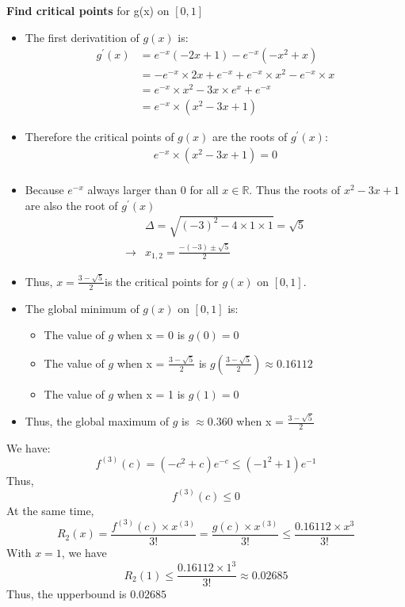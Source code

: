 \documentclass{article}
\begin{document}
\begin{enumerate}[label=({\alph*})]
        \textbf{Find critical points} for g(x) on \([0, 1]\)
        \begin{itemize}
            \item The first derivatition of \(g(x)\) is:
            \begin{align*}
                g^{'}(x) &= e^{-x}(-2x + 1) - e^{-x}(-x^{2} + x) \\
                &= -e^{-x} \times 2x + e^{-x} + e^{-x} \times x^{2} - e^{-x} \times x \\
                &= e^{-x} \times x^{2} - 3x \times e^{x} + e^{-x} \\
                &= e^{-x} \times (x^{2} - 3x + 1) 
            \end{align*}
            \item Therefore the critical points of \(g(x)\) are the roots of \(g^{'}(x)\):
            \begin{align*}
                e^{-x} \times (x^{2} - 3x + 1) = 0 \\
            \end{align*}
            \item Because \(e^{-x}\) always larger than 0 for all \(x \in \mathbb{R}\). Thus the roots of \(x^{2} - 3x + 1\) are also the root of \(g^{'}(x)\)
            \begin{align}
                &\Delta = \sqrt{(-3)^{2} - 4 \times 1 \times 1} = \sqrt{5} \\
                \rightarrow& x_{1, 2} = \frac{-(-3) \pm \sqrt{5}}{2} 
            \end{align}
            \item Thus, \(x = \frac{3 - \sqrt{5}}{2}\)is the critical points for \(g(x)\) on \([0, 1]\).
            \item The global minimum of \(g(x)\) on \([0, 1]\) is:
            \begin{itemize}
                \item The value of \(g\) when x = 0 is \(g(0) = 0\)
                \item The value of \(g\) when x = \(\frac{3 - \sqrt{5}}{2}\) is \(g(\frac{3 - \sqrt{5}}{2}) \approx 0.16112\)
                \item The value of \(g\) when x = 1 is \(g(1) = 0\)
            \end{itemize}
            \item Thus, the global maximum of \(g\) is \(\approx 0.360\) when x = \(\frac{3 - \sqrt{5}}{2}\)
        \end{itemize}
        We have:
        \[f^{(3)}(c) = (-c^{2} + c)e^{-c} \leq (-1^2 + 1) e^{-1}\]
        Thus,
        \[f^{(3)}(c) \leq 0\]
        At the same time,
        \[R_{2}(x) = \frac{f^{(3)}(c) \times x^{(3)}}{3!} = \frac{g(c) \times x^{(3)    }}{3!} \leq \frac{0.16112 \times x^{3}}{3!}\]
        With \(x = 1\), we have 
        \[R_{2}(1) \leq \frac{0.16112 \times 1^3}{3!} \approx 0.02685\]
        Thus, the upperbound is \(0.02685\)
    \end{enumerate}
    \newpage
\end{document}
